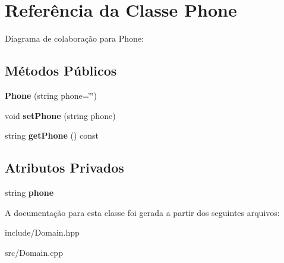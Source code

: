\hypertarget{classPhone}{}\section{Referência da Classe Phone}
\label{classPhone}


Diagrama de colaboração para Phone\+:
\subsection*{Métodos Públicos}
\begin{DoxyCompactItemize}
\item 
{\bfseries Phone} (string phone=\char`\"{}\char`\"{})\hypertarget{classPhone_a8affd7892d22f44a9143b3c8d044016f}{}\label{classPhone_a8affd7892d22f44a9143b3c8d044016f}

\item 
void {\bfseries set\+Phone} (string phone)\hypertarget{classPhone_ac3e4f7f8d293c0a619e2affe942417f6}{}\label{classPhone_ac3e4f7f8d293c0a619e2affe942417f6}

\item 
string {\bfseries get\+Phone} () const \hypertarget{classPhone_ae607ab2f5cb8728a096bc9daa2900e22}{}\label{classPhone_ae607ab2f5cb8728a096bc9daa2900e22}

\end{DoxyCompactItemize}
\subsection*{Atributos Privados}
\begin{DoxyCompactItemize}
\item 
string {\bfseries phone}\hypertarget{classPhone_a65aa255d594dacf2b1ae311c44cfcc63}{}\label{classPhone_a65aa255d594dacf2b1ae311c44cfcc63}

\end{DoxyCompactItemize}


A documentação para esta classe foi gerada a partir dos seguintes arquivos\+:\begin{DoxyCompactItemize}
\item 
include/Domain.\+hpp\item 
src/Domain.\+cpp\end{DoxyCompactItemize}
